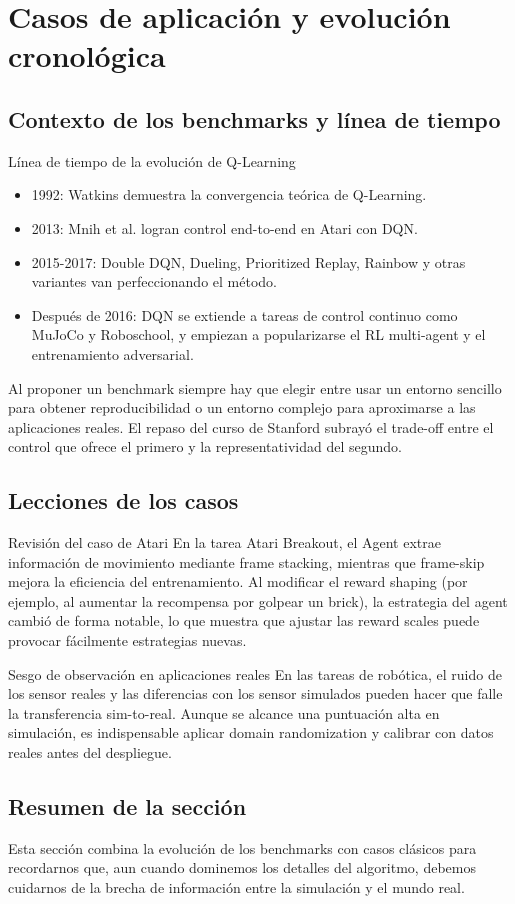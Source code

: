 \section{Casos de aplicación y evolución cronológica}

\subsection{Contexto de los benchmarks y línea de tiempo}

\begin{knowledgebox}{Línea de tiempo de la evolución de Q-Learning}
\begin{itemize}
    \item 1992: Watkins demuestra la convergencia teórica de Q-Learning.
    \item 2013: Mnih et al. logran control end-to-end en Atari con DQN.
    \item 2015-2017: Double DQN, Dueling, Prioritized Replay, Rainbow y otras variantes van perfeccionando el método.
    \item Después de 2016: DQN se extiende a tareas de control continuo como MuJoCo y Roboschool, y empiezan a popularizarse el RL multi-agent y el entrenamiento adversarial.
\end{itemize}
\end{knowledgebox}

Al proponer un benchmark siempre hay que elegir entre usar un entorno sencillo para obtener reproducibilidad o un entorno complejo para aproximarse a las aplicaciones reales. El repaso del curso de Stanford subrayó el trade-off entre el control que ofrece el primero y la representatividad del segundo.

\subsection{Lecciones de los casos}

\begin{importantbox}{Revisión del caso de Atari}
En la tarea Atari Breakout, el Agent extrae información de movimiento mediante frame stacking, mientras que frame-skip mejora la eficiencia del entrenamiento. Al modificar el reward shaping (por ejemplo, al aumentar la recompensa por golpear un brick), la estrategia del agent cambió de forma notable, lo que muestra que ajustar las reward scales puede provocar fácilmente estrategias nuevas.
\end{importantbox}

\begin{warningbox}{Sesgo de observación en aplicaciones reales}
En las tareas de robótica, el ruido de los sensor reales y las diferencias con los sensor simulados pueden hacer que falle la transferencia sim-to-real. Aunque se alcance una puntuación alta en simulación, es indispensable aplicar domain randomization y calibrar con datos reales antes del despliegue.
\end{warningbox}

\subsection{Resumen de la sección}

Esta sección combina la evolución de los benchmarks con casos clásicos para recordarnos que, aun cuando dominemos los detalles del algoritmo, debemos cuidarnos de la brecha de información entre la simulación y el mundo real.
